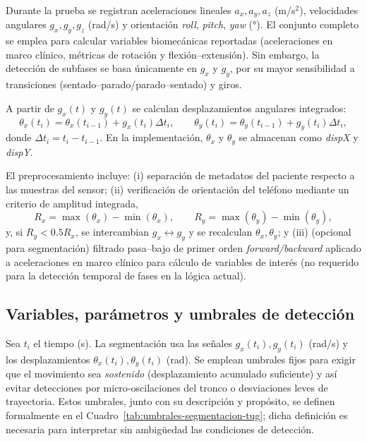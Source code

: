 \documentclass[12pt]{report}
\begin{document}
\begin{justify}
    Durante la prueba se registran aceleraciones lineales $a_x,a_y,a_z$ (m/s$^2$), velocidades angulares $g_x,g_y,g_z$ (rad/s) y orientación \textit{roll}, \textit{pitch}, \textit{yaw} (°). El conjunto completo se emplea para calcular variables biomecánicas reportadas (aceleraciones en marco clínico, métricas de rotación y flexión--extensión). Sin embargo, la detección de subfases se basa únicamente en $g_x$ y $g_y$, por su mayor sensibilidad a transiciones (sentado--parado/parado--sentado) y giros.

    A partir de $g_x(t)$ y $g_y(t)$ se calculan desplazamientos angulares integrados:
    \[
        \theta_x(t_i)=\theta_x(t_{i-1})+g_x(t_i)\Delta t_i,\qquad
        \theta_y(t_i)=\theta_y(t_{i-1})+g_y(t_i)\Delta t_i,
    \]
    donde $\Delta t_i=t_i-t_{i-1}$. En la implementación, $\theta_x$ y $\theta_y$ se almacenan como \textit{dispX} y \textit{dispY}.

    El preprocesamiento incluye: (i) separación de metadatos del paciente respecto a las muestras del sensor; (ii) verificación de orientación del teléfono mediante un criterio de amplitud integrada,
    \[
        R_x=\max(\theta_x)-\min(\theta_x),\qquad R_y=\max(\theta_y)-\min(\theta_y),
    \]
    y, si $R_y<0.5R_x$, se intercambian $g_x\leftrightarrow g_y$ y se recalculan $\theta_x,\theta_y$; y (iii) (opcional para segmentación) filtrado pasa--bajo de primer orden \textit{forward/backward} aplicado a aceleraciones en marco clínico para cálculo de variables de interés (no requerido para la detección temporal de fases en la lógica actual).

    \subsection{Variables, parámetros y umbrales de detección}
    \label{subsec:variables-umbrales-tug}

    Sea $t_i$ el tiempo (s). La segmentación usa las señales $g_x(t_i),g_y(t_i)$ (rad/s) y los desplazamientos $\theta_x(t_i),\theta_y(t_i)$ (rad). Se emplean umbrales fijos para exigir que el movimiento sea \textit{sostenido} (desplazamiento acumulado suficiente) y así evitar detecciones por micro-oscilaciones del tronco o desviaciones leves de trayectoria. Estos umbrales, junto con su descripción y propósito, se definen formalmente en el Cuadro~\ref{tab:umbrales-segmentacion-tug}; dicha definición es necesaria para interpretar sin ambigüedad las condiciones de detección.\\


\end{justify}
\end{document}
